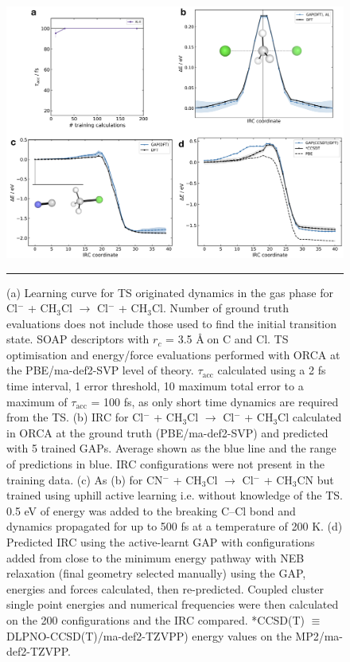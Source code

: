 \documentclass[../../main.tex]{subfiles}
\newcommand{\taua}{$\tau_\text{acc}$ }
\begin{document}
\begin{figure}[h!]
	\vspace{0.4cm}
	\centering
	\includegraphics[width=15cm]{6/gap/figs_si/fig16}
	\vspace{0.2cm}
	\hrule
	\caption{(a) Learning curve for TS originated dynamics in the gas phase for Cl${}^{-}$ + CH${}_{3}$Cl $\rightarrow$ Cl${}^{-}$ + CH${}_{3}$Cl. Number of ground truth evaluations does not include those used to find the initial transition state. SOAP descriptors with $r_c$ = 3.5 \AA$\;$on C and Cl. TS optimisation and energy/force evaluations performed with ORCA at the PBE/ma-def2-SVP level of theory. \taua calculated using a 2 fs time interval, 1 \kcalx error threshold, 10 \kcalx maximum total error to a maximum of \taua = 100 fs, as only short time dynamics are required from the TS. (b) IRC for Cl${}^{-}$ + CH${}_{3}$Cl $\rightarrow$ Cl${}^{-}$ + CH${}_{3}$Cl calculated in ORCA at the ground truth (PBE/ma-def2-SVP) and predicted with 5 trained GAPs. Average shown as the blue line and the range of predictions in blue. IRC configurations were not present in the training data. (c) As (b) for CN${}^{-}$ + CH${}_{3}$Cl $\rightarrow$ Cl${}^{-}$ + CH${}_{3}$CN but trained using uphill active learning i.e. without knowledge of the TS. 0.5 eV of energy was added to the breaking C–Cl bond and dynamics propagated for up to 500 fs at a temperature of 200 K. (d) Predicted IRC using the active-learnt GAP with configurations added from close to the minimum energy pathway with NEB relaxation (final geometry selected manually) using the GAP, energies and forces calculated, then re-predicted. Coupled cluster single point energies and numerical frequencies were then calculated on the 200 configurations and the IRC compared. *CCSD(T) $\equiv$ DLPNO-CCSD(T)/ma-def2-TZVPP) energy values on the MP2/ma-def2-TZVPP.}
	\label{fig::ml_si_16}
\end{figure}
\end{document}
